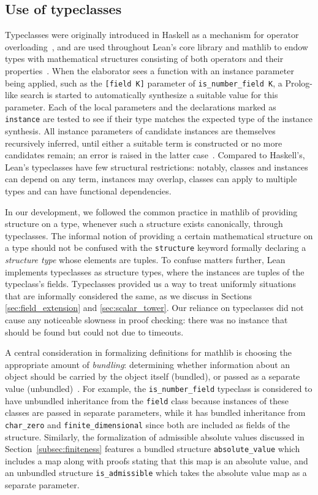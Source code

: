 \documentclass[sn-mathphys]{sn-jnl}%
\newcommand{\lean}[1]{\texttt{#1}\xspace}
\newcommand{\mathlib}{\textsf{mathlib}\xspace}
\begin{document}
\subsection{Use of typeclasses} \label{sec:typeclasses}
Typeclasses were originally introduced in Haskell as a mechanism for operator overloading~\cite{typeclasses-haskell},
and are used throughout Lean's core library and \mathlib to endow types with mathematical structures consisting of both operators and their properties~\cite{mathlib}.
When the elaborator sees a function with an instance parameter being applied, such as the \lean{[field K]} parameter of \lean{is\_number\_field K}, a Prolog-like search is started to automatically synthesize a suitable value for this parameter.
Each of the local parameters and the declarations marked as \lean{instance} are tested to see if their type matches the expected type of the instance synthesis.
All instance parameters of candidate instances are themselves recursively inferred, until either a suitable term is constructed or no more candidates remain; an error is raised in the latter case~\cite[Section 10]{theorem-proving-in-lean}.
Compared to Haskell's, Lean's typeclasses have few structural restrictions: notably, classes and instances can depend on any term, instances may overlap, classes can apply to multiple types and can have functional dependencies.

In our development, we followed the common practice in \mathlib of providing structure on a type,
whenever such a structure exists canonically, through typeclasses.
The informal notion of providing a certain mathematical structure on a type should not be confused with the \lean{structure} keyword formally declaring a \emph{structure type} whose elements are tuples.
To confuse matters further, Lean implements typeclasses as structure types, where the instances are tuples of the typeclass's fields.
Typeclasses provided us a way to treat uniformly situations that are informally considered the same, as we discuss in Sections \ref{sec:field_extension} and \ref{sec:scalar_tower}.
Our reliance on typeclasses did not cause any noticeable slowness in proof checking:
there was no instance that should be found but could not due to timeouts.

A central consideration in formalizing definitions for \mathlib is choosing the appropriate amount of \emph{bundling}:
determining whether information about an object should be carried by the object itself (bundled), or passed as a separate value (unbundled)~\cite{instance-parameters-mathlib}.
For example, the \lean{is\_number\_field} typeclass is considered to have unbundled inheritance from the \lean{field} class because instances of these classes are passed in separate parameters,
while it has bundled inheritance from \lean{char\_zero} and \lean{finite\_dimensional} since both are included as fields of the structure.
Similarly, the formalization of admissible absolute values discussed in Section~\ref{subsec:finiteness} features a bundled structure \lean{absolute\_value} which includes a map along with proofs stating that this map is an absolute value,
and an unbundled structure \lean{is\_admissible} which takes the absolute value map as a separate parameter.
\end{document}
